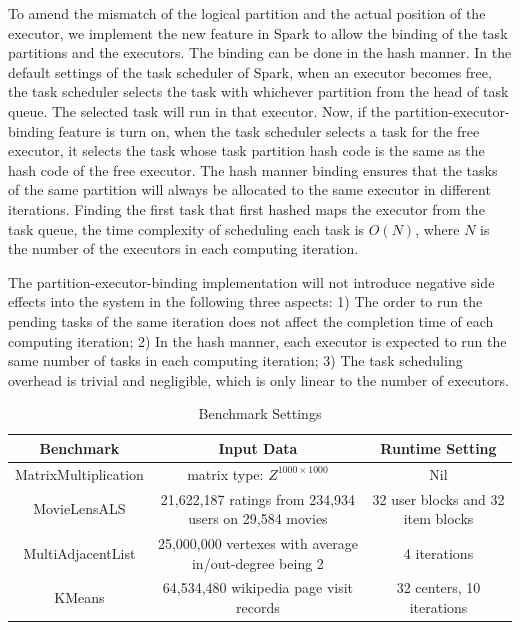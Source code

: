 \documentclass[10pt,journal,compsoc]{IEEEtran}
\begin{document}
To amend the mismatch of the logical partition and the actual position of the executor, we implement the new feature in Spark to allow the binding of the task partitions and the executors. 
The binding can be done in the hash manner. 
In the default settings of the task scheduler of Spark, when an executor becomes free, the task scheduler selects the task with whichever partition from the head of task queue. The selected task will run in that executor. 
Now, if the partition-executor-binding feature is turn on, when the task scheduler selects a task for the free executor, 
it selects the task whose task partition hash code is the same as the hash code of the free executor. 
The hash manner binding ensures that the tasks of the same partition will always be allocated to the same executor in different iterations. 
Finding the first task that first hashed maps the executor from the task queue, 
the time complexity of scheduling each task is $O(N)$, 
where $N$ is the number of the executors in each computing iteration. 

The partition-executor-binding implementation will not introduce negative side effects into the system in the following three aspects: 1)  The order to run the pending tasks of the same iteration does not affect the completion time of each computing iteration; 2) In the hash manner, each executor is expected to run the same number of tasks in each computing iteration;
3) The task scheduling overhead is trivial and negligible, which is only linear to the number of executors. 


\begin{table}[!t]
\renewcommand{\arraystretch}{1}
\caption{Benchmark Settings}
\label{table:benchmark}
\centering
\begin{tabularx}{0.85\textwidth}{ c || c | c }
\hline
\textbf{Benchmark} & \textbf{Input Data} & \textbf{Runtime Setting} \\
\hline
MatrixMultiplication & matrix type: $Z^{1000 \times 1000}$ & Nil\\
\hline
MovieLensALS & 21,622,187 ratings from 234,934 users on 29,584 movies &32 user blocks and 32 item blocks\\%
\hline
MultiAdjacentList & 25,000,000 vertexes with average in/out-degree being 2& 4 iterations \\%
\hline
KMeans & 64,534,480 wikipedia page visit records& 32 centers, 10 iterations \\
\hline
\end{tabularx}
\end{table}
\end{document}
